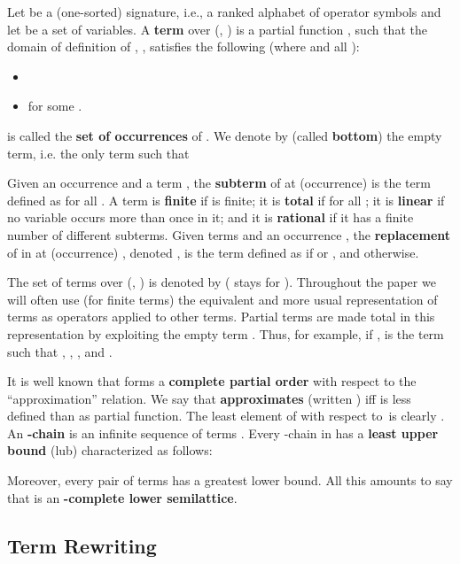 \documentclass{eptcs}
\theoremstyle{plain}
\theoremstyle{definition}
\begin{document}
Let  be a (one-sorted) signature, i.e., a ranked alphabet of 
operator
symbols  and let  be a set of
variables. 
A {\bf term} over (,
) is a partial function ,
such that the
domain of definition of , , satisfies the following 
(where  and all ):
\begin{itemize}
\item 

\item 
for some .
\end{itemize}

 is called the {\bf set of occurrences} of 
. 
We denote by  (called {\bf bottom}) the empty term, i.e. the 
only term such that 


Given an occurrence  and a term , the {\bf subterm}  
of  at (occurrence) 
is the term
 defined as  for all .
A term  is {\bf finite\/} if  is finite; 
it  is {\bf
total\/} if  for all ;
it is {\bf linear} if no variable occurs more than once in it;
and it is {\bf rational} if it has a finite number of different
subterms.
Given terms  and an occurrence , the {\bf
replacement} of  in  at (occurrence) ,
denoted , is the term defined as  if  or , and 
otherwise.  

The set of terms over (, ) is denoted by
 ( stays for
).
Throughout the paper we will often use (for finite terms) the
equivalent and more usual representation of terms as operators applied
to other terms. Partial terms are made total in this representation by
exploiting the empty term . Thus, for example, if , 
is the term such that , 
, , and .





It is well known that  forms a {\bf complete partial 
order} 
with respect to the ``approximation'' relation. We say that  {\bf 
approximates}  (written ) iff  is less defined than     
 as partial function.
The least element of  with respect to\  is clearly 
. An {\bf -chain}
 is an infinite sequence of terms
. Every -chain
 in  has a {\bf least
upper bound} (lub)  characterized as
follows:


Moreover, every pair of terms has a greatest lower bound.  All this 
amounts 
to say that
 is an {\bf -complete lower semilattice}.



\subsection{Term Rewriting}
\label{ss:Term Rewriting}
\end{document}
